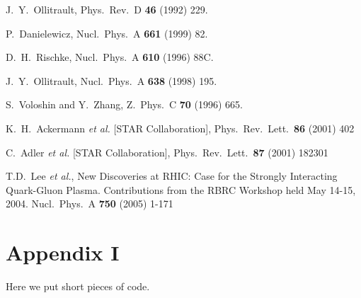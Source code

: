 \documentclass[a5paper]{book}
\numberwithin{equation}{subsection}
\begin{document}
	\begin{thebibliography}{99}
				
				  
		J.~Y.~Ollitrault,
		Phys.\ Rev.\ D {\bf 46} (1992) 229.
				
		P.~Danielewicz,
		Nucl.\ Phys.\ A {\bf 661} (1999) 82.
				
		D.~H.~Rischke,
		Nucl.\ Phys.\ A {\bf 610} (1996) 88C.
				
		J.~Y.~Ollitrault,
		Nucl.\ Phys.\ A {\bf 638} (1998) 195.
				
		S.~Voloshin and Y.~Zhang,
		Z.\ Phys.\ C {\bf 70} (1996) 665.
				
		K.~H.~Ackermann {\it et al.}  [STAR Collaboration],
		Phys.\ Rev.\ Lett.\  {\bf 86} (2001) 402
				  
		C.~Adler {\it et al.}  [STAR Collaboration],
		Phys.\ Rev.\ Lett.\  {\bf 87} (2001) 182301  
				
		T.D.~Lee {\it et al.}, 
		New Discoveries at RHIC: Case for the Strongly Interacting 
		Quark-Gluon Plasma. 
		Contributions from the RBRC Workshop held May 14-15, 2004.
		Nucl.\ Phys.\ A {\bf 750} (2005) 1-171
				
				    
	\end{thebibliography}
		
	\chapter*{Appendix I}
	\label{appendix1}
	Here we put short pieces of code.
	\printindex
\end{document}
